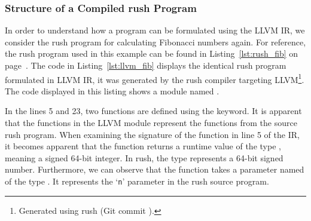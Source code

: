 \subsubsection{Structure of a Compiled rush Program}
In order to understand how a program can be formulated using the LLVM IR, we consider the rush program for calculating Fibonacci numbers again.
For reference, the rush program used in this example can be found in Listing~\ref{lst:rush_fib} on page~\pageref{lst:rush_fib}.
The code in Listing~\ref{lst:llvm_fib} displays the identical rush program formulated in LLVM IR,
it was generated by the rush compiler targeting LLVM\footnote{Generated using rush (Git commit \rushCommit{}).}.
The code displayed in this listing shows a module named .


In the lines 5 and 23, two functions are defined using the  keyword.
It is apparent that the functions in the LLVM module represent the functions from the source rush program.
When examining the signature of the  function in line 5 of the IR,
it becomes apparent that the function returns a runtime value of the type , meaning a signed 64-bit integer.
In rush, the  type represents a 64-bit signed number.
Furthermore, we can observe that the function takes a parameter named  of the type .
It represents the `\texttt{n}' parameter in the rush source program.

